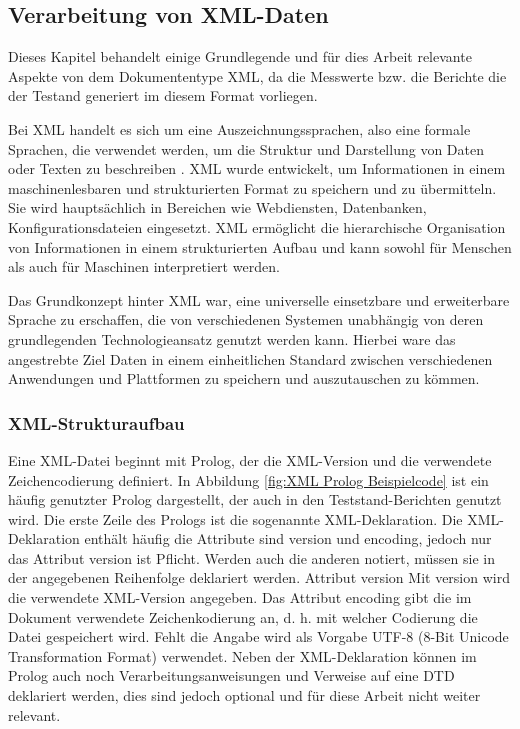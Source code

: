 \subsection{Verarbeitung von XML-Daten}
\label{subsec:verarbeitung-von-xml-daten}

Dieses Kapitel behandelt einige Grundlegende und für dies Arbeit relevante Aspekte von dem Dokumententype \ac{XML},
da die Messwerte bzw. die Berichte die der Testand generiert im diesem Format vorliegen.


Bei \ac{XML} handelt es sich um eine Auszeichnungssprachen, also eine
formale Sprachen, die verwendet werden, um die Struktur und Darstellung von Daten oder Texten zu beschreiben \cite*{Neumann2019}.
\ac{XML} wurde entwickelt, um Informationen in einem maschinenlesbaren und strukturierten Format zu speichern und zu übermitteln.
Sie wird hauptsächlich in Bereichen wie Webdiensten, Datenbanken, Konfigurationsdateien eingesetzt.
\ac{XML} ermöglicht die hierarchische Organisation von Informationen in einem strukturierten Aufbau und kann sowohl für Menschen
als auch für Maschinen interpretiert werden.

Das Grundkonzept hinter \ac{XML} war, eine universelle einsetzbare und erweiterbare Sprache zu erschaffen, die von verschiedenen Systemen
unabhängig von deren grundlegenden Technologieansatz genutzt werden kann.
Hierbei ware das angestrebte Ziel Daten in einem einheitlichen Standard zwischen verschiedenen Anwendungen und Plattformen zu speichern und auszutauschen
zu kömmen.

\subsubsection{XML-Strukturaufbau}

Eine \ac{XML}-Datei beginnt mit Prolog, der die \ac{XML}-Version und die verwendete Zeichencodierung definiert.
In Abbildung \ref{fig:XML Prolog Beispielcode} ist ein häufig genutzter Prolog dargestellt, der auch in den Teststand-Berichten genutzt wird.
Die erste Zeile des Prologs ist die sogenannte XML-Deklaration.
Die XML-Deklaration enthält häufig die Attribute sind version und encoding, jedoch nur das Attribut version ist Pflicht.
Werden auch die anderen notiert, müssen sie in der angegebenen Reihenfolge deklariert werden.
Attribut version Mit version wird die verwendete XML-Version angegeben.
Das Attribut encoding gibt die im Dokument verwendete Zeichenkodierung an, d. h. mit welcher Codierung die Datei gespeichert wird.
Fehlt die Angabe wird als Vorgabe UTF-8 (8-Bit Unicode Transformation Format) verwendet.
Neben der \ac{XML}-Deklaration können im Prolog auch noch Verarbeitungsanweisungen und Verweise auf eine \ac{DTD} deklariert werden,
dies sind jedoch optional und für diese Arbeit nicht weiter relevant.
\cite*[8,9]{Becher2022}

